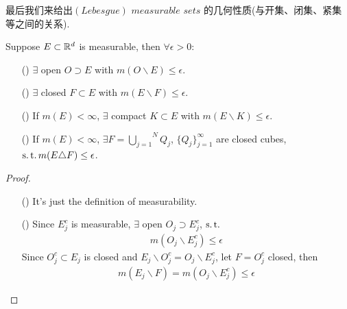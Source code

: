 	最后我们来给出$(Lebesgue) \,\, measurable \,\, sets$ 的几何性质(与开集、闭集、紧集等之间的关系).
	\begin{thm}\label{thm 1.3.4}
		Suppose $E \subset \mathbb{R}^d$ is measurable, then $\forall \epsilon > 0 :$
		\begin{enumerate}
			\item[(\rmnum{1})]$\exists$ open $O \supset E$ with $m(O \backslash E) \leq \epsilon$.
			
			\item[(\rmnum{2})]$\exists$ closed $F \subset E$ with $m(E \backslash F) \leq \epsilon$.
			
			\item[(\rmnum{3})]If $m(E) < \infty$, $\exists$ compact $K \subset E$ with $m(E \backslash K) \leq \epsilon$.
			
			\item[(\rmnum{4})]If $m(E) < \infty$, $\exists F = \overset{N}{\underset{j = 1}{\bigcup}}{Q_j}$, $\{ Q_j \}_{j = 1}^\infty$ are closed cubes, $\operatorname{s.t.} m(E \triangle F) \leq \epsilon$.
		\end{enumerate}
		
		\vspace{2em}
		\begin{proof}
			\begin{enumerate}
				\item[(\rmnum{1})]It's just the definition of measurability.
				
				\item[(\rmnum{2})]Since $E_{j}^c$ is measurable, $\exists$ open $O_j \supset E_{j}^c$, $\operatorname{s.t.}$
				\begin{align}
					m(O_j \backslash E_{j}^c) \leq \epsilon
				\end{align}
				Since $O_{j}^c \subset E_j$ is closed and $E_j \backslash O_{j}^c = O_j \backslash E_{j}^c$, let $F = O_{j}^c$ closed, then
				\begin{align}
					m(E_j \backslash F) = m(O_j \backslash E_{j}^c) \leq \epsilon
				\end{align}
				

\end{enumerate}
\end{proof}
\end{thm}
